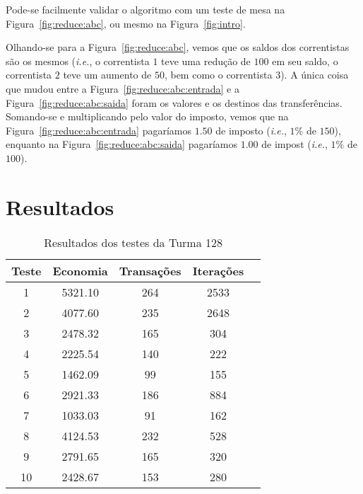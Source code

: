 \documentclass[12pt]{article}
\begin{document}
Pode-se facilmente validar o algoritmo com um teste de mesa na
Figura~\ref{fig:reduce:abc}, ou mesmo na Figura~\ref{fig:intro}.

Olhando-se para a Figura~\ref{fig:reduce:abc}, vemos que os saldos dos
correntistas são os mesmos (\textit{i.e.}, o correntista $1$ teve uma redução de
$100$ em seu saldo, o correntista $2$ teve um aumento de $50$, bem como o
correntista $3$). A única coisa que mudou entre a
Figura~\ref{fig:reduce:abc:entrada} e a Figura~\ref{fig:reduce:abc:saida} foram
os valores e os destinos das transferências. Somando-se e multiplicando pelo
valor do imposto, vemos que na Figura~\ref{fig:reduce:abc:entrada} pagaríamos
$1.50$ de imposto (\textit{i.e.}, $1\%$ de $150$), enquanto na
Figura~\ref{fig:reduce:abc:saida} pagaríamos $1.00$ de impost (\textit{i.e.},
$1\%$ de $100$).

\section{Resultados}\label{sec:resultados}

\begin{table}[H]
  \centering
\begin{tabular}{||c|c||c|c|c||}
  \hline
Teste & Economia & Transações & Iterações \\ [0.5ex]
  \hline\hline
  1 & 5321.10 & 264 & 2533 \\
  \hline
  2 & 4077.60 & 235 & 2648 \\
  \hline
  3 & 2478.32 & 165 & 304 \\
  \hline
  4 & 2225.54 & 140 & 222 \\
  \hline
  5 & 1462.09  & 99 & 155 \\
  \hline
  6 & 2921.33 & 186 & 884 \\
  \hline
  7 & 1033.03  & 91 & 162 \\
  \hline
  8 & 4124.53 & 232 & 528 \\
  \hline
  9 & 2791.65 & 165 & 320 \\
  \hline
  10 & 2428.67 & 153 & 280 \\
\hline
\end{tabular}

\caption{Resultados dos testes da Turma 128}
\label{tab:resultados}
\end{table}

\end{document}
